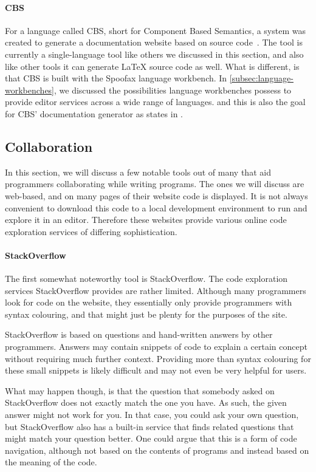 \paragraph{CBS}

For a language called CBS, short for Component Based Semantics, a system was created to generate a documentation website based on source code~\autocite{Mosses19}.
The tool is currently a single-language tool like others we discussed in this section, and also like other tools it can generate LaTeX source code as well.
What is different, is that CBS is built with the Spoofax language workbench.
In \cref{subsec:language-workbenches}, we discussed the possibilities language workbenches possess to provide editor services across a wide range of languages.
and this is also the goal for CBS' documentation generator as \citeauthor{Mosses23} states in \autocite*{Mosses23}.

\subsection{Collaboration}

In this section, we will discuss a few notable tools out of many that aid programmers collaborating while writing programs.
The ones we will discuss are web-based, and on many pages of their website code is displayed.
It is not always convenient to download this code to a local development environment to run and explore it in an editor.
Therefore these websites provide various online code exploration services of differing sophistication.

\paragraph{StackOverflow}

The first somewhat noteworthy tool is StackOverflow.
The code exploration services StackOverflow provides are rather limited.
Although many programmers look for code on the website, they essentially only provide programmers with syntax colouring, and that might just be plenty for the purposes of the site.

StackOverflow is based on questions and hand-written answers by other programmers.
Answers may contain snippets of code to explain a certain concept without requiring much further context.
Providing more than syntax colouring for these small snippets is likely difficult and may not even be very helpful for users.

What may happen though, is that the question that somebody asked on StackOverflow does not exactly match the one you have.
As such, the given answer might not work for you.
In that case, you could ask your own question, but StackOverflow also has a built-in service that finds related questions that might match your question better.
One could argue that this is a form of code navigation, although not based on the contents of programs and instead based on the meaning of the code.

